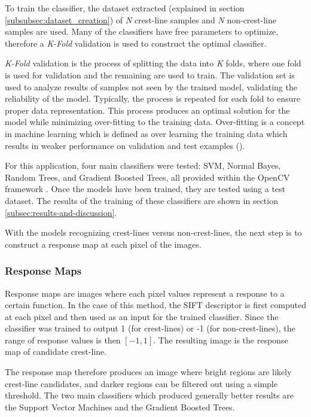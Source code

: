 To train the classifier, the dataset extracted (explained in section \ref{subsubsec:dataset_creation}) of \emph{N} crest-line samples and \emph{N} non-crest-line samples are used. Many of the classifiers have free parameters to optimize, therefore a \emph{K-Fold} validation is used to construct the optimal classifier. 

\emph{K-Fold} validation is the process of splitting the data into \emph{K} folds, where one fold is used for validation and the remaining are used to train. The validation set is used to analyze results of samples not seen by the trained model, validating the reliability of the model. Typically, the process is repeated for each fold to ensure proper data representation. This process produces an optimal solution for the model while minimizing over-fitting to the training data. Over-fitting is a concept in machine learning which is defined as over learning the training data which results in weaker performance on validation and test examples (\cite{the-problem-of-overfitting,neural-network-studies-overfitting-overtraining,over-fitting-model-selection-bias}).

For this application, four main classifiers were tested: SVM, Normal Bayes, Random Trees, and Gradient Boosted Trees, all provided within the OpenCV framework \cite{opencv_library}. Once the models have been trained, they are tested using a test dataset. The results of the training of these classifiers are shown in section \ref{subsec:results-and-discussion}.

With the models recognizing crest-lines versus non-crest-lines, the next step is to construct a response map at each pixel of the images.

\subsubsection{Response Maps} \label{subsubsec:response_maps}

Response maps are images where each pixel values represent a response to a certain function. In the case of this method, the SIFT descriptor is first computed at each pixel and then used as an input for the trained classifier. Since the classifier was trained to output 1 (for crest-lines) or -1 (for non-crest-lines), the range of response values is then $[-1, 1]$. The resulting image is the response map of candidate crest-line.

The response map therefore produces an image where bright regions are likely crest-line candidates, and darker regions can be filtered out using a simple threshold. The two main classifiers which produced generally better results are the Support Vector Machines and the Gradient Boosted Trees. 

